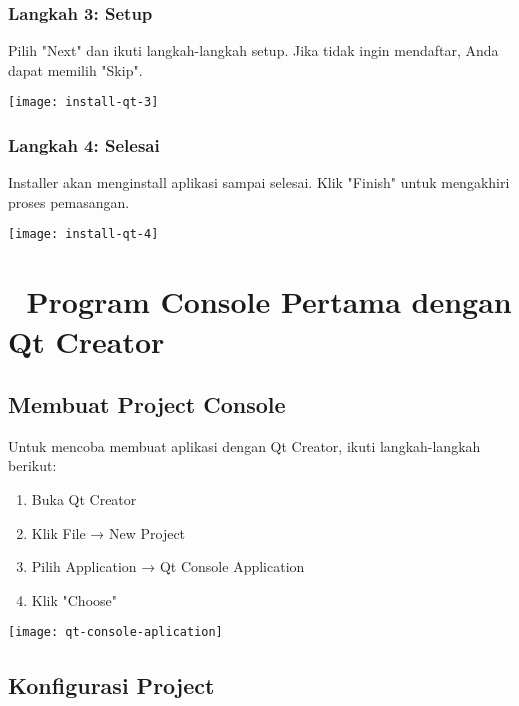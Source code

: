 \subsubsection{Langkah 3: Setup}
  
Pilih "Next" dan ikuti langkah-langkah setup. Jika tidak ingin mendaftar, Anda dapat memilih "Skip".
  
\begin{center}
	 \texttt{[image: install-qt-3]}
\end{center}
 
\subsubsection{Langkah 4: Selesai}

Installer akan menginstall aplikasi sampai selesai. Klik "Finish" untuk mengakhiri proses pemasangan.

\begin{center}
	\texttt{[image: install-qt-4]}
\end{center}

\section{🚀 Program Console Pertama dengan Qt Creator}

\subsection{Membuat Project Console}

Untuk mencoba membuat aplikasi dengan Qt Creator, ikuti langkah-langkah berikut:

\begin{enumerate}
\item Buka Qt Creator
\item Klik File → New Project
\item Pilih Application → Qt Console Application
\item Klik "Choose"
\end{enumerate}

  \begin{center}
  \texttt{[image: qt-console-aplication]}
  \end{center}

\subsection{Konfigurasi Project}

